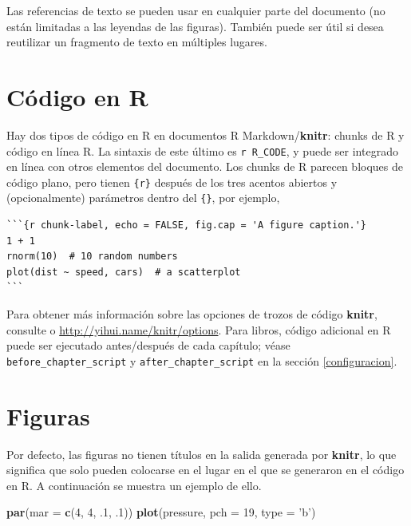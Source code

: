 \documentclass[12pt,]{krantz}
\makeatletter
\newenvironment{Shaded}{\begin{snugshade}}{\end{snugshade}}
\newcommand{\KeywordTok}[1]{\textcolor[rgb]{0.13,0.29,0.53}{\textbf{#1}}}
\newcommand{\DataTypeTok}[1]{\textcolor[rgb]{0.13,0.29,0.53}{#1}}
\newcommand{\DecValTok}[1]{\textcolor[rgb]{0.00,0.00,0.81}{#1}}
\newcommand{\StringTok}[1]{\textcolor[rgb]{0.31,0.60,0.02}{#1}}
\newcommand{\NormalTok}[1]{#1}
\newenvironment{kframe}{%
\medskip{}
\setlength{\fboxsep}{.8em}
 \def\at@end@of@kframe{}%
 \ifinner\ifhmode%
  \def\at@end@of@kframe{\end{minipage}}%
  \begin{minipage}{\columnwidth}%
 \fi\fi%
 \def\FrameCommand##1{\hskip\@totalleftmargin \hskip-\fboxsep
 \colorbox{shadecolor}{##1}\hskip-\fboxsep
     \hskip-\linewidth \hskip-\@totalleftmargin \hskip\columnwidth}%
 \MakeFramed {\advance\hsize-\width
   \@totalleftmargin\z@ \linewidth\hsize
   \@setminipage}}%
 {\par\unskip\endMakeFramed%
 \at@end@of@kframe}
\renewenvironment{Shaded}{\begin{kframe}}{\end{kframe}}
\theoremstyle{definition}
\theoremstyle{definition}
\theoremstyle{definition}
\theoremstyle{remark}
\makeatother
\begin{document}
Las referencias de texto se pueden usar en cualquier parte del documento
(no están limitadas a las leyendas de las figuras). También puede ser
útil si desea reutilizar un fragmento de texto en múltiples lugares.

\section{Código en R}\label{codigo-en-r}

Hay dos tipos de código en R en documentos R Markdown/\textbf{knitr}:
chunks de R y código en línea R. La sintaxis de este último es
\texttt{\textasciigrave{}r\ R\_CODE\textasciigrave{}}, y puede ser
integrado en línea con otros elementos del documento. Los chunks de R
parecen bloques de código plano, pero tienen \texttt{\{r\}} después de
los tres acentos abiertos y (opcionalmente) parámetros dentro del
\texttt{\{\}}, por ejemplo,

\begin{verbatim}
```{r chunk-label, echo = FALSE, fig.cap = 'A figure caption.'}
1 + 1
rnorm(10)  # 10 random numbers
plot(dist ~ speed, cars)  # a scatterplot
```
\end{verbatim}

Para obtener más información sobre las opciones de trozos de código
\textbf{knitr}, consulte \citet{xie2015} o
\url{http://yihui.name/knitr/options}. Para libros, código adicional en
R puede ser ejecutado antes/después de cada capítulo; véase
\texttt{before\_chapter\_script} y \texttt{after\_chapter\_script} en la
sección \ref{configuracion}.

\section{Figuras}\label{figuras}

Por defecto, las figuras no tienen títulos en la salida generada por
\textbf{knitr}, lo que significa que solo pueden colocarse en el lugar
en el que se generaron en el código en R. A continuación se muestra un
ejemplo de ello.

\begin{Shaded}
\begin{Highlighting}[]
\KeywordTok{par}\NormalTok{(}\DataTypeTok{mar =} \KeywordTok{c}\NormalTok{(}\DecValTok{4}\NormalTok{, }\DecValTok{4}\NormalTok{, .}\DecValTok{1}\NormalTok{, .}\DecValTok{1}\NormalTok{))}
\KeywordTok{plot}\NormalTok{(pressure, }\DataTypeTok{pch =} \DecValTok{19}\NormalTok{, }\DataTypeTok{type =} \StringTok{'b'}\NormalTok{)}
\end{Highlighting}
\end{Shaded}
\end{document}
